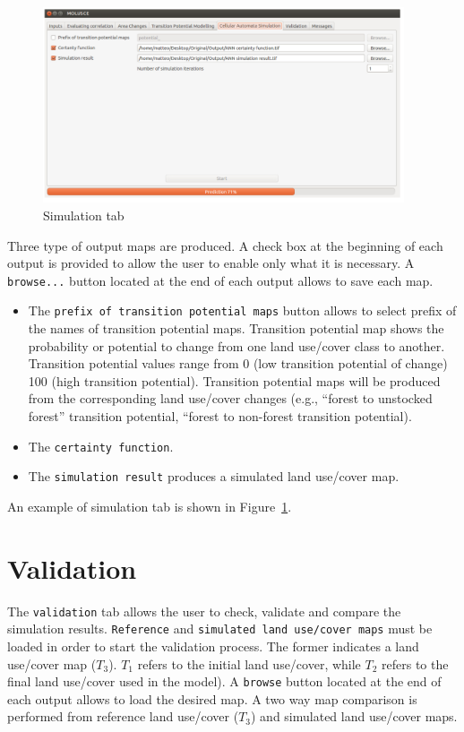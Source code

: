 \documentclass{report}
\begin{document}
\begin{figure}[h!]
\centering
\includegraphics[width=0.95\textwidth]{img/simulation_tab.png}
\caption{Simulation tab}
\label{fig:simulation_tab}
\end{figure}

Three type of output maps are produced. A check box at the beginning of each output is provided to
allow the user to enable only what it is necessary. A \verb+browse...+ button located at the end of each
output allows to save each map.

\begin{itemize}
  \item The \verb+prefix of transition potential maps+ button allows to select prefix of the names of
    transition potential maps. Transition potential map shows the probability or potential to
    change from one land use/cover class to another. Transition potential values range from 0
    (low transition potential of change) 100 (high transition potential). Transition potential maps
    will be produced from the corresponding land use/cover changes (e.g., “forest to unstocked
    forest” transition potential, “forest to non-forest transition potential).
  \item The \verb+certainty function+.
  \item The \verb+simulation result+ produces a simulated land use/cover map.
\end{itemize}

An example of simulation tab is shown in Figure~\ref{fig:simulation_tab}.

\section{Validation}

The \verb+validation+ tab allows the user to check, validate and compare the simulation results. 
\verb+Reference+ and \verb+simulated land use/cover maps+ must be loaded in order 
to start the validation process. The
former indicates a land use/cover map ($T_3$). $T_1$ refers to the initial land use/cover, while $T_2$ refers to
the final land use/cover used in the model). A \verb+browse+ button located at the end of each output
allows to load the desired map. A two way map comparison is performed from reference land
use/cover ($T_3$) and simulated land use/cover maps.
\end{document}
